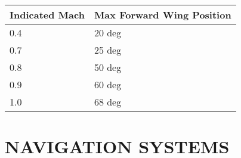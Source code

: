 \documentclass[fontInter]{TechCheck}
\begin{document}
	\begin{center}
		\begin{tabular}{p{3cm} | p{5cm}}
			\toprule
			\textbf{Indicated Mach} & \textbf{Max Forward Wing Position} \\
			\midrule
			0.4 & 20 deg \\
			\midrule
			0.7 & 25 deg \\
			\midrule
			0.8 & 50 deg \\
			\midrule
			0.9 & 60 deg \\
			\midrule
			1.0 & 68 deg \\
			\bottomrule
		\end{tabular}
	\end{center}


	\clearpage

	\section{NAVIGATION SYSTEMS}
\end{document}
